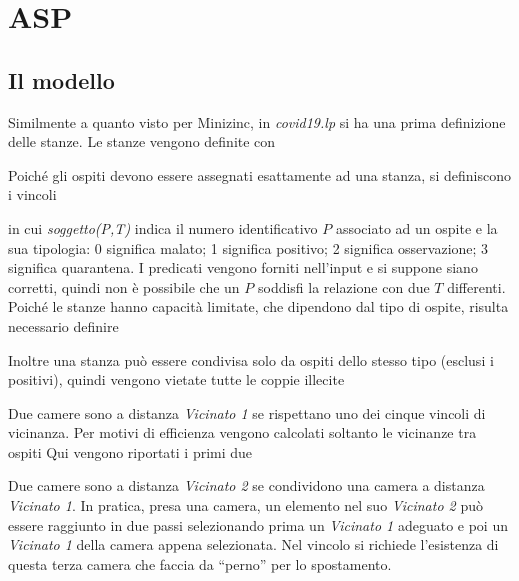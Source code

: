 
\section{ASP}
\subsection{Il modello}

Similmente a quanto visto per Minizinc, in \emph{covid19.lp} si ha una prima definizione delle stanze.
Le stanze vengono definite con


\noindent
Poiché gli ospiti devono essere assegnati esattamente ad una stanza, si definiscono i vincoli

in cui \emph{soggetto(P,T)} indica il numero identificativo $P$ associato ad un ospite e la sua tipologia:
0 significa malato;
1 significa positivo;
2 significa osservazione;
3 significa quarantena.
I predicati vengono forniti nell'input e si suppone siano corretti, quindi non è possibile che un $P$ soddisfi la relazione con due $T$ differenti.
\\
\noindent
Poiché le stanze hanno capacità limitate, che dipendono dal tipo di ospite, risulta necessario definire


\noindent
Inoltre una stanza può essere condivisa solo da ospiti dello stesso tipo (esclusi i positivi),
quindi vengono vietate tutte le coppie illecite


\noindent
Due camere sono a distanza \emph{Vicinato 1} se rispettano uno dei cinque vincoli di vicinanza.
Per motivi di efficienza vengono calcolati soltanto le vicinanze tra ospiti  
Qui vengono riportati i primi due


\noindent
Due camere sono a distanza \emph{Vicinato 2} se condividono una camera a distanza \emph{Vicinato 1}.
In pratica, presa una camera, un elemento nel suo \emph{Vicinato 2} può essere raggiunto in due passi selezionando prima un \emph{Vicinato 1} adeguato e poi un \emph{Vicinato 1} della camera appena selezionata.
Nel vincolo si richiede l'esistenza di questa terza camera che faccia da ``perno'' per lo spostamento.


